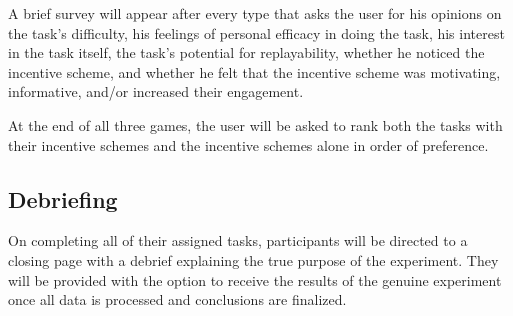 A brief survey will appear after every type that asks the user for his opinions on the task’s difficulty, his feelings of personal efficacy in doing the task, his interest in the task itself, the task’s potential for replayability, whether he noticed the incentive scheme, and whether he felt that the incentive scheme was motivating, informative, and/or increased their engagement. 

At the end of all three games, the user will be asked to rank both the tasks with their incentive schemes and the incentive schemes alone in order of preference.

 \subsection{Debriefing}
On completing all of their assigned tasks, participants will be directed to a closing page with a debrief explaining the true purpose of the experiment. They will be provided with the option to receive the results of the genuine experiment once all data is processed and conclusions are finalized.
